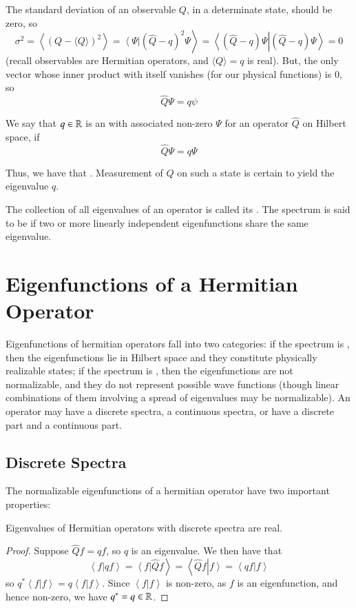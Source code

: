 \documentclass[12pt, a4paper, oneside, openright, titlepage]{book}
\newcommand{\braket}[2]{\left\langle#1\right\vert\left.#2\right\rangle}
\begin{document}
The standard deviation of an observable $Q$, in a determinate state, should be zero, so $$\sigma^2 = \left\langle (Q-\langle Q\rangle)^2\right\rangle = \braket{\Psi}{(\hat{Q}-q)^2\Psi} = \braket{(\hat{Q}-q)\Psi}{(\hat{Q}-q)\Psi} = 0$$ (recall observables are Hermitian operators, and $\langle Q \rangle = q$ is real). But, the only vector whose inner product with itself vanishes (for our physical functions) is $0$, so $$\hat{Q}\Psi = q\psi$$ 

\begin{defn}
    We say that $q \in \mathbb R$ is an  with associated non-zero  $\Psi$ for an operator $\hat{Q}$ on Hilbert space, if $$\hat{Q}\Psi = q\Psi$$ 
\end{defn}

Thus, we have that . Measurement of $Q$ on such a state is certain to yield the eigenvalue $q$.

\begin{defn}
    The collection of all eigenvalues of an operator is called its . The spectrum is said to be  if two or more linearly independent eigenfunctions share the same eigenvalue.
\end{defn}

\section{Eigenfunctions of a Hermitian Operator}

Eigenfunctions of hermitian operators fall into two categories: if the spectrum is , then the eigenfunctions lie in Hilbert space and they constitute physically realizable states; if the spectrum is , then the eigenfunctions are not normalizable, and they do not represent possible wave functions (though linear combinations of them involving a spread of eigenvalues may be normalizable). An operator may have a discrete spectra, a continuous spectra, or have a discrete part and a continuous part.

\subsection{Discrete Spectra}

The normalizable eigenfunctions of a hermitian operator have two important properties:

\begin{thm}
    Eigenvalues of Hermitian operators with discrete spectra are real.
\end{thm}
\begin{proof}
    Suppose $\hat{Q}f = qf$, so $q$ is an eigenvalue. We then have that $$\braket{f}{qf} = \braket{f}{\hat{Q}f} = \braket{\hat{Q}f}{f} = \braket{qf}{f}$$ so $q^*\braket{f}{f} = q\braket{f}{f}$. Since $\braket{f}{f}$ is non-zero, as $f$ is an eigenfunction, and hence non-zero, we have $q^* = q \in \mathbb R$.
\end{proof}
\end{document}
